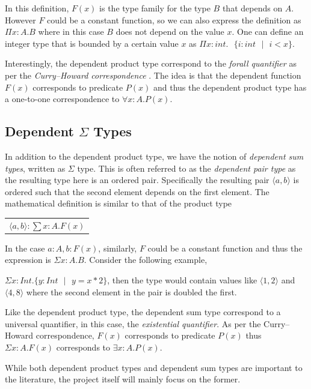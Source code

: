 \documentclass[a4paper,12pt]{report}
\begin{document}
In this definition, $F(x)$ is the type family for the type $B$ that depends on $A$.
However $F$ could be a constant function, so we can also express the definition 
as $\Pi x:A.B$ where in this case $B$ does not depend 
on the value $x$. One can define an integer type that is bounded by a certain 
value $x$ as $\Pi x:int.\text{ }\{ i:int\text{ }|\text{ }i < x\}$.

\par
Interestingly, the dependent product type correspond to the 
\textit{forall quantifier} as per 
the \textit{Curry–Howard correspondence} \cite{cHoward}. The idea is that the dependent 
function $F(x)$ corresponds to predicate $P(x)$ and thus the dependent product 
type has a one-to-one correspondence to $\forall x: A. P(x)$.

\subsection{Dependent $\Sigma$ Types}
In addition to the dependent product type, we have the notion of \textit{dependent sum 
types}, written as $\Sigma$ type. This is often referred to as the 
\textit{dependent pair type} as the resulting type here is an ordered pair. 
Specifically the resulting pair $\langle a,b \rangle$ is ordered such that the 
second element depends on the first element. The 
mathematical definition is similar to that of the product type
\begin{center}
 \begin{tabular}{l}
   $\langle a,b \rangle :\sum x: A.  F(x)$
 \end{tabular} 
\end{center}
In the case $a:A, b: F(x)$, similarly, $F$ could be a constant function and thus 
the expression is $\Sigma x:A.B$. Consider the following example, 

$\Sigma x: Int.\{y:Int\text{ }|\text{ } y = x * 2\}$, then the type would 
contain values like $\langle 1,2 \rangle$ and $\langle 4,8 \rangle$ where the 
second element in the pair is doubled the first.

\par
Like the dependent product type, the dependent sum type correspond to a 
universal quantifier, in this case, the \textit{existential quantifier}. As 
per the Curry–Howard correspondence, $F(x)$ corresponds to predicate $P(x)$ 
thus $\Sigma x:A.F(x)$ corresponds to $\exists x: A. P(x)$.

\par
While both dependent product types and dependent sum types are important to the 
literature, the project itself will mainly focus on the former.
\end{document}
